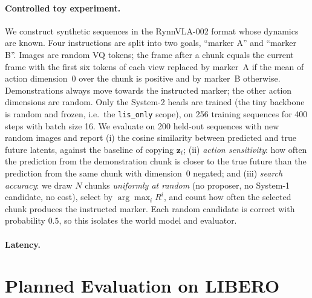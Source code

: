 \documentclass[11pt]{article}
\newcommand{\zt}{\bm{z}_t}
\begin{document}
\paragraph{Controlled toy experiment.}
We construct synthetic sequences in the RynnVLA-002 format whose dynamics are known. Four instructions are split into two goals, ``marker A'' and ``marker B''. Images are random VQ tokens; the frame after a chunk equals the current frame with the first six tokens of each view replaced by marker~A if the mean of action dimension~0 over the chunk is positive and by marker~B otherwise. Demonstrations always move towards the instructed marker; the other action dimensions are random. Only the System-2 heads are trained (the tiny backbone is random and frozen, i.e.\ the \texttt{lis\_only} scope), on 256 training sequences for 400 steps with batch size 16. We evaluate on 200 held-out sequences with new random images and report (i) the cosine similarity between predicted and true future latents, against the baseline of copying $\zt$; (ii) \emph{action sensitivity}: how often the prediction from the demonstration chunk is closer to the true future than the prediction from the same chunk with dimension~0 negated; and (iii) \emph{search accuracy}: we draw $N$ chunks \emph{uniformly at random} (no proposer, no System-1 candidate, no cost), select by $\arg\max_i R^i$, and count how often the selected chunk produces the instructed marker. Each random candidate is correct with probability $0.5$, so this isolates the world model and evaluator.



\paragraph{Latency.}


\section{Planned Evaluation on LIBERO}
\label{sec:protocol}
\end{document}
